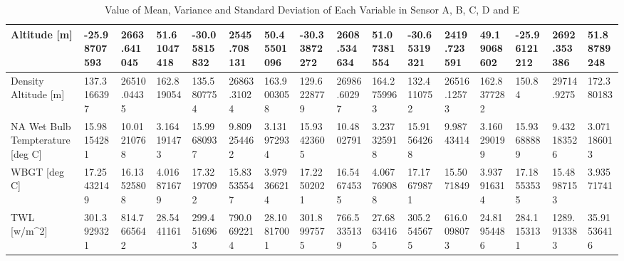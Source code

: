 \documentclass[a4paper,12pt]{article} %
\begin{document}
\begin{enumerate}
\begin{table}[H]
{\begin{tabular}{|l|l|l|l|l|l|l|l|l|l|l|l|l|l|l|l|}
Altitude {[}m{]}                                & -25.98707593 & 2663.641045 & 51.61047418 & -30.05815832 & 2545.708131 & 50.45501096 & -30.33872272 & 2608.534634 & 51.07381554 & -30.65319321 & 2419.723591 & 49.19068602 & -25.96121212 & 2692.353386 & 51.88789248 \\ \hline
Density Altitude {[}m{]}                        & 137.3166397  & 26510.04435 & 162.819054  & 135.5807754  & 26863.31024 & 163.9003058 & 129.6228779  & 26986.60297 & 164.2759963 & 132.4110752  & 26516.12573 & 162.8377282 & 150.84       & 29714.9275  & 172.380183  \\ \hline
NA Wet Bulb Tempterature {[}deg C{]}            & 15.98154281  & 10.01210768 & 3.164191473 & 15.99680937  & 9.809254462 & 3.131972934 & 15.93423605  & 10.4802791  & 3.237325918 & 15.91564268  & 9.98743414  & 3.160290199 & 15.93688889  & 9.432183526 & 3.071186013 \\ \hline
WBGT {[}deg C{]}                                & 17.25432149  & 16.13525808 & 4.016871679 & 17.32197092  & 15.83535547 & 3.979366214 & 17.22502021  & 16.54674535 & 4.067769088 & 17.17679871  & 15.5071849  & 3.937916314 & 17.18553535  & 15.48987153 & 3.93571741  \\ \hline
TWL {[}w/m\textasciicircum{}2{]}                & 301.3929321  & 814.7665642 & 28.5441161  & 299.4516963  & 790.0692214 & 28.10817001 & 301.8997575  & 766.5335139 & 27.68634165 & 305.2545675  & 616.0098073 & 24.81954486 & 284.1153131  & 1289.913383 & 35.91536416 \\ \hline
\end{tabular}
}
\caption{\label{tab:table-name}Value of Mean, Variance and Standard Deviation of Each Variable in Sensor A, B, C, D and E}
\end{table}


\end{enumerate}
\end{document}
